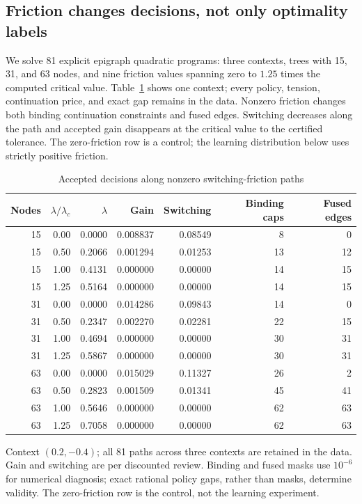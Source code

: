 \documentclass[11pt,letterpaper]{article}
\theoremstyle{definition}
\newcommand{\1}{\mathbf 1}
\begin{document}
\subsection{Friction changes decisions, not only optimality labels}
We solve 81 explicit epigraph quadratic programs: three contexts, trees with 15, 31, and 63 nodes, and nine friction values spanning zero to $1.25$ times the computed critical value. Table~\ref{tab:r13-friction} shows one context; every policy, tension, continuation price, and exact gap remains in the data. Nonzero friction changes both binding continuation constraints and fused edges. Switching decreases along the path and accepted gain disappears at the critical value to the certified tolerance. The zero-friction row is a control; the learning distribution below uses strictly positive friction.

\begin{table}[t]
\centering\small
\caption{Accepted decisions along nonzero switching-friction paths}\label{tab:r13-friction}
\begin{tabular}{rrrrrrr}\toprule
Nodes & $\lambda/\lambda_c$ & $\lambda$ & Gain & Switching & Binding caps & Fused edges \\\midrule
15 & 0.00 & 0.0000 & 0.008837 & 0.08549 & 8 & 0 \\
15 & 0.50 & 0.2066 & 0.001294 & 0.01253 & 13 & 12 \\
15 & 1.00 & 0.4131 & 0.000000 & 0.00000 & 14 & 15 \\
15 & 1.25 & 0.5164 & 0.000000 & 0.00000 & 14 & 15 \\
31 & 0.00 & 0.0000 & 0.014286 & 0.09843 & 14 & 0 \\
31 & 0.50 & 0.2347 & 0.002270 & 0.02281 & 22 & 15 \\
31 & 1.00 & 0.4694 & 0.000000 & 0.00000 & 30 & 31 \\
31 & 1.25 & 0.5867 & 0.000000 & 0.00000 & 30 & 31 \\
63 & 0.00 & 0.0000 & 0.015029 & 0.11327 & 26 & 2 \\
63 & 0.50 & 0.2823 & 0.001509 & 0.01341 & 45 & 41 \\
63 & 1.00 & 0.5646 & 0.000000 & 0.00000 & 62 & 63 \\
63 & 1.25 & 0.7058 & 0.000000 & 0.00000 & 62 & 63 \\
\bottomrule\end{tabular}
\par\smallskip\begin{minipage}{.96\textwidth}\footnotesize Context $(0.2,-0.4)$; all 81 paths across three contexts are retained in the data. Gain and switching are per discounted review. Binding and fused masks use $10^{-6}$ for numerical diagnosis; exact rational policy gaps, rather than masks, determine validity. The zero-friction row is the control, not the learning experiment.\end{minipage}
\end{table}
\end{document}
